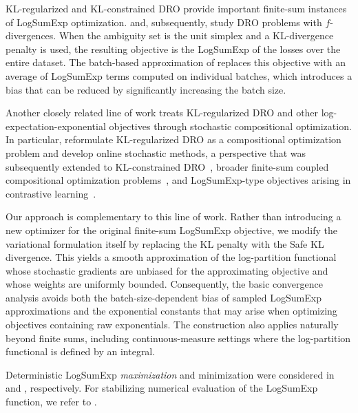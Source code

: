 \documentclass{article}
\theoremstyle{plain}
\theoremstyle{definition}
\theoremstyle{remark}
\begin{document}
KL-regularized and KL-constrained DRO provide important finite-sum instances of LogSumExp optimization.
\citet{huKullbackLeiblerDivergenceConstrained} and, subsequently, \citet{levy2020large} study DRO problems with $f$-divergences.
When the ambiguity set is the unit simplex and a KL-divergence penalty is used, the resulting objective is the LogSumExp of the losses over the entire dataset.
The batch-based approximation of \citet{levy2020large} replaces this objective with an average of LogSumExp terms computed on individual batches, which introduces a bias that can be reduced by significantly increasing the batch size.

Another closely related line of work treats KL-regularized DRO and other log-expectation-exponential objectives through stochastic compositional optimization. 
In particular, \citet{qi2021online} reformulate KL-regularized DRO as a compositional optimization problem and develop online stochastic methods, a perspective that was subsequently extended to KL-constrained DRO~\citep{qi2022stochastic_constrained_dro}, broader finite-sum coupled compositional optimization problems~\citep{wang2022finite_sum_coupled}, and LogSumExp-type objectives arising in contrastive learning~\citep{yuan2022sogclr}. 

Our approach is complementary to this line of work.
Rather than introducing a new optimizer for the original finite-sum LogSumExp objective, we modify the variational formulation itself by replacing the KL penalty with the Safe KL divergence.
This yields a smooth approximation of the log-partition functional whose stochastic gradients are unbiased for the approximating objective and whose weights are uniformly bounded.
Consequently, the basic convergence analysis avoids both the batch-size-dependent bias of sampled LogSumExp approximations and the exponential constants that may arise when optimizing objectives containing raw exponentials.
The construction also applies naturally beyond finite sums, including continuous-measure settings where the log-partition functional is defined by an integral.

Deterministic LogSumExp \emph{maximization} and minimization were considered in \citet{Selvi2020ConvexMaximization} and \citet{KanNagyRuthotto2023LSEMINK}, respectively.
For stabilizing numerical evaluation of the LogSumExp function, we refer to \citet{BlanchardHighamHigham2020AccurateLogSumExp,Higham2021WhatIsLogSumExp}.
\end{document}
